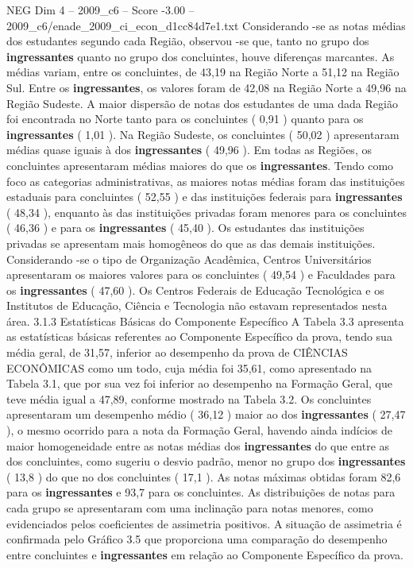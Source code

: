 \begin{textsample}{NEG Dim 4 – 2009\_c6 – Score -3.00 – 2009\_c6/enade\_2009\_ci\_econ\_d1cc84d7e1.txt}
Considerando -se as notas médias dos estudantes segundo cada Região, observou -se que, tanto no grupo dos \textbf{ingressantes} quanto no grupo dos concluintes, houve diferenças marcantes.
As médias variam, entre os concluintes, de 43,19 na Região Norte a 51,12 na Região Sul.
Entre os \textbf{ingressantes}, os valores foram de 42,08 na Região Norte a 49,96 na Região Sudeste.
A maior dispersão de notas dos estudantes de uma dada Região foi encontrada no Norte tanto para os concluintes ( 0,91 ) quanto para os \textbf{ingressantes} ( 1,01 ).
Na Região Sudeste, os concluintes ( 50,02 ) apresentaram médias quase iguais à dos \textbf{ingressantes} ( 49,96 ).
Em todas as Regiões, os concluintes apresentaram médias maiores do que os \textbf{ingressantes}.
Tendo como foco as categorias administrativas, as maiores notas médias foram das instituições estaduais para concluintes ( 52,55 ) e das instituições federais para \textbf{ingressantes} ( 48,34 ), enquanto às das instituições privadas foram menores para os concluintes ( 46,36 ) e para os \textbf{ingressantes} ( 45,40 ).
Os estudantes das instituições privadas se apresentam mais homogêneos do que as das demais instituições.
Considerando -se o tipo de Organização Acadêmica, Centros Universitários apresentaram os maiores valores para os concluintes ( 49,54 ) e Faculdades para os \textbf{ingressantes} ( 47,60 ).
Os Centros Federais de Educação Tecnológica e os Institutos de Educação, Ciência e Tecnologia não estavam representados nesta área. 3.1.3 Estatísticas Básicas do Componente Específico A Tabela 3.3 apresenta as estatísticas básicas referentes ao Componente Específico da prova, tendo sua média geral, de 31,57, inferior ao desempenho da prova de CIÊNCIAS ECONÔMICAS como um todo, cuja média foi 35,61, como apresentado na Tabela 3.1, que por sua vez foi inferior ao desempenho na Formação Geral, que teve média igual a 47,89, conforme mostrado na Tabela 3.2.
Os concluintes apresentaram um desempenho médio ( 36,12 ) maior ao dos \textbf{ingressantes} ( 27,47 ), o mesmo ocorrido para a nota da Formação Geral, havendo ainda indícios de maior homogeneidade entre as notas médias dos \textbf{ingressantes} do que entre as dos concluintes, como sugeriu o desvio padrão, menor no grupo dos \textbf{ingressantes} ( 13,8 ) do que no dos concluintes ( 17,1 ).
As notas máximas obtidas foram 82,6 para os \textbf{ingressantes} e 93,7 para os concluintes.
As distribuições de notas para cada grupo se apresentaram com uma inclinação para notas menores, como evidenciados pelos coeficientes de assimetria positivos.
A situação de assimetria é confirmada pelo Gráfico 3.5 que proporciona uma comparação do desempenho entre concluintes e \textbf{ingressantes} em relação ao Componente Específico da prova.

\end{textsample}
